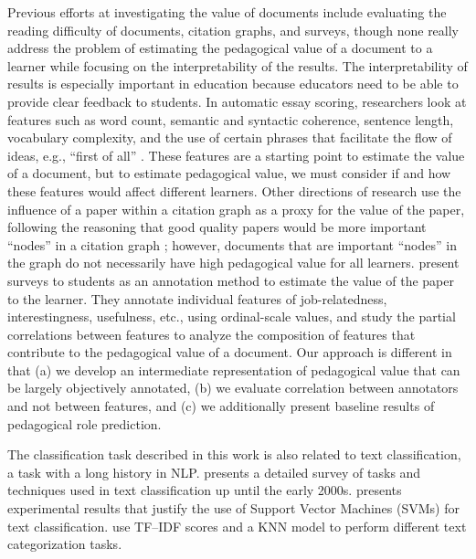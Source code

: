 \documentclass[11pt,a4paper]{article}
\begin{document}
Previous efforts at investigating the value of documents include evaluating the reading difficulty of documents, citation graphs, and surveys, though none really address the problem of estimating the pedagogical value of a document to a learner while focusing on the interpretability of the results. The interpretability of results is especially important in education because educators need to be able to provide clear feedback to students. In automatic essay scoring, researchers look at features such as word count, semantic and syntactic coherence, sentence length, vocabulary complexity, and the use of certain phrases that facilitate the flow of ideas, e.g., ``first of all'' \cite{burstein2004automated,shermis2013handbook}. These features are a starting point to estimate the value of a document, but to estimate pedagogical value, we must consider if and how these features would affect different learners. Other directions of research use the influence of a paper within a citation graph as a proxy for the value of the paper, following the reasoning that good quality papers would be more important ``nodes'' in a citation graph \cite{ekstrand2010automatically}; however, documents that are important ``nodes'' in the graph do not necessarily have high pedagogical value for all learners. \citet{tang2009pedagogical} present surveys to students as an annotation method to estimate the value of the paper to the learner. %
They annotate individual features of job-relatedness, interestingness, usefulness, etc., using ordinal-scale values, and study the partial correlations between features to analyze the composition of features that contribute to the pedagogical value of a document. Our approach is different in that (a) we develop an intermediate representation of pedagogical value that can be largely objectively annotated, (b) we evaluate correlation between annotators and not between features, and (c) we additionally present baseline results of pedagogical role prediction.

The classification task described in this work is also related to text classification, a task with a long history in NLP. \citet{sebastiani2002machine} presents a detailed survey of tasks and techniques used in text classification up until the early 2000s. \citet{joachims1998text} presents experimental results that justify the use of Support Vector Machines (SVMs) for text classification. \citet{soucy2001simple} use TF--IDF scores and a KNN model to perform different text categorization tasks.
\end{document}
